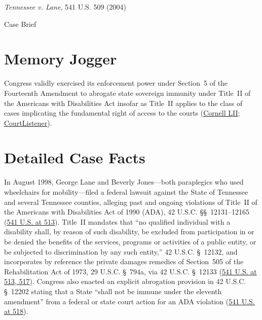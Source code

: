 \documentclass[12pt]{article}
\begin{document}
\begin{center}
{\LARGE \textit{Tennessee v. Lane}, 541 U.S. 509 (2004)\par}
\vspace{0.8em}
{\large Case Brief\par}
\end{center}
\vspace{1em}

\section{Memory Jogger}
Congress validly exercised its enforcement power under Section~5 of the Fourteenth Amendment to abrogate state sovereign immunity under Title~II of the Americans with Disabilities Act insofar as Title~II applies to the class of cases implicating the fundamental right of access to the courts (\href{https://www.law.cornell.edu/supremecourt/text/541/509}{Cornell LII}; \href{https://www.courtlistener.com/opinion/134743/tennessee-v-lane/}{CourtListener}).

\section{Detailed Case Facts}
In August 1998, George Lane and Beverly Jones---both paraplegics who used wheelchairs for mobility---filed a federal lawsuit against the State of Tennessee and several Tennessee counties, alleging past and ongoing violations of Title~II of the Americans with Disabilities Act of 1990 (ADA), 42 U.S.C. \S\S~12131--12165 (\href{https://www.law.cornell.edu/supremecourt/text/541/509}{541 U.S. at 513}). Title~II mandates that ``no qualified individual with a disability shall, by reason of such disability, be excluded from participation in or be denied the benefits of the services, programs or activities of a public entity, or be subjected to discrimination by any such entity,'' 42 U.S.C. \S~12132, and incorporates by reference the private damages remedies of Section~505 of the Rehabilitation Act of 1973, 29 U.S.C. \S~794a, via 42 U.S.C. \S~12133 (\href{https://www.law.cornell.edu/supremecourt/text/541/509}{541 U.S. at 513, 517}). Congress also enacted an explicit abrogation provision in 42 U.S.C. \S~12202 stating that a State ``shall not be immune under the eleventh amendment'' from a federal or state court action for an ADA violation (\href{https://www.law.cornell.edu/supremecourt/text/541/509}{541 U.S. at 518}).
\end{document}
